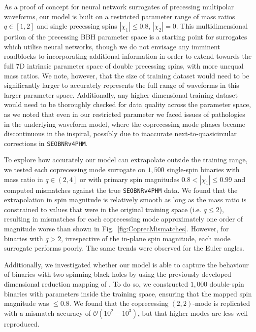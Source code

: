 \documentclass[prd,amssymb,amsmath,amsfonts,superscriptaddress,nofootinbib,reprint,showpacs, longbibliography]{revtex4-1}
\newcommand{\SEOB}{\texttt{SEOBNRv4PHM}}
\begin{document}
As a proof of concept for neural network surrogates of precessing multipolar waveforms, our model is built on a restricted parameter range of mass ratios $q\in\left[1,2\right]$ and single precessing spins $\left|\chi_{1}\right|\leq 0.8$, $\left|\chi_{2}\right|= 0$. This multidimensional portion of the precessing BBH parameter space is a starting point for surrogates which utilise neural networks, though we do not envisage any imminent roadblocks to incorporating additional information in order to extend towards the full 7D intrinsic parameter space of double precessing spins, with more unequal mass ratios. We note, however, that the size of training dataset would need to be significantly larger to accurately represents the full range of waveforms in this larger parameter space. Additionally, any higher dimensional training dataset would need to be thoroughly checked for data quality across the parameter space, as we noted that even in our restricted parameter we faced issues of pathologies in the underlying waveform model, where the coprecessing mode phases became discontinuous in the inspiral, possibly due to inaccurate next-to-quasicircular corrections in \SEOB{}. 

To explore how accurately our model can extrapolate outside the training range, we tested each coprecessing mode surrogate on $1,500$ single-spin binaries with mass ratio in $q\in\left(2,4\right]$ or with primary spin magnitudes $0.8<\left|\chi_{1}\right|\leq 0.99$ and computed mismatches against the true \SEOB{} data. 
We found that the extrapolation in spin magnitude is relatively smooth as long as the mass ratio is constrained to values that were in the original training space (i.e. $q\leq 2$), resulting in mismatches for each coprecessing mode approximately one order of magnitude worse than shown in Fig.~\ref{fig:CoprecMismatches}. However, for binaries with $q>2$, irrespective of the in-plane spin magnitude, each mode surrogate performs poorly. The same trends were observed for the Euler angles.

Additionally, we investigated whether our model is able to capture the behaviour of binaries with two spinning black holes by using the previously developed dimensional reduction mapping of \cite{Thomas:2020uqj}. To do so, we constructed $1,000$ double-spin binaries with parameters inside the training space, ensuring that the mapped spin magnitude was $\leq 0.8$. We found that the coprecessing $(2,2)$-mode is replicated with a mismatch accuracy of $\mathcal{O}(10^2 - 10^3)$, but that higher modes are less well reproduced.
\end{document}
